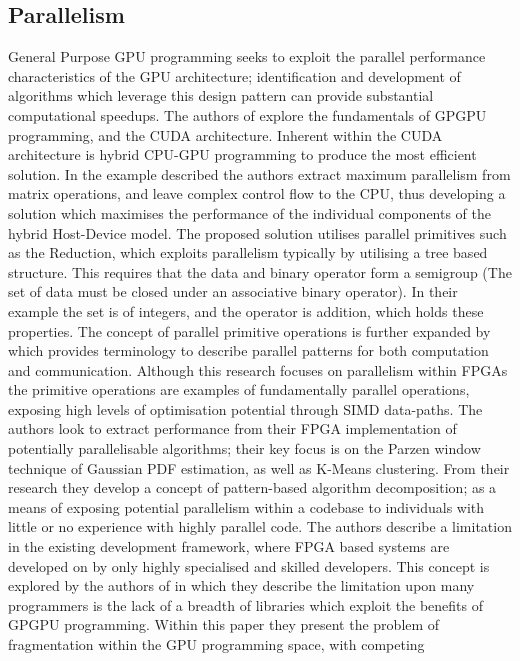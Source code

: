 \subsection{Parallelism}
General Purpose GPU programming seeks to exploit the parallel performance characteristics of the GPU
architecture; identification and development of algorithms which leverage this design pattern can
provide substantial computational speedups. The authors of \cite{papadrakakis2011new} explore the
fundamentals of GPGPU programming, and the CUDA architecture. Inherent within the CUDA architecture
is hybrid CPU-GPU programming to produce the most efficient solution. In the example described the
authors extract maximum parallelism from matrix operations, and leave complex control flow to the
CPU, thus developing a solution which maximises the performance of the individual components of the
hybrid Host-Device model. The proposed solution utilises parallel primitives such as the Reduction,
which exploits parallelism typically by utilising a tree based structure. This requires that the
data and binary operator form a semigroup (The set of data must be closed under an associative
binary operator). In their example the set is of integers, and the operator is addition, which holds
these properties.  The concept of parallel primitive operations is further expanded by
\cite{nagarajan2011accelerating} which provides terminology to describe parallel patterns for both
computation and communication.  Although this research focuses on parallelism within FPGAs the
primitive operations are examples of fundamentally parallel operations, exposing high levels of
optimisation potential through SIMD data-paths. The authors look to extract performance from their
FPGA implementation of potentially parallelisable algorithms; their key focus is on the Parzen
window technique of Gaussian PDF estimation, as well as K-Means clustering. From their research they
develop a concept of pattern-based algorithm decomposition; as a means of exposing potential
parallelism within a codebase to individuals with little or no experience with highly parallel code.
The authors describe a limitation in the existing development framework, where FPGA based systems
are developed on by only highly specialised and skilled developers. This concept is explored by the
authors of \cite{sengupta2007scan} in which they describe the limitation upon many programmers is
the lack of a breadth of libraries which exploit the benefits of GPGPU programming.  Within this
paper they present the problem of fragmentation within the GPU programming space, with competing
